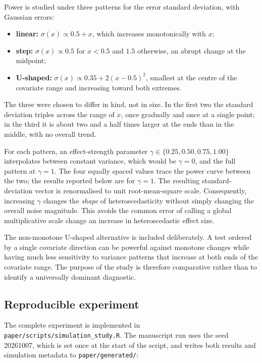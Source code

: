 Power is studied under three patterns for the error standard deviation, with
Gaussian errors:

\begin{itemize}
\tightlist
\item
  \textbf{linear:} \(\sigma(x)\propto 0.5+x\), which increases monotonically with
  \(x\);
\item
  \textbf{step:} \(\sigma(x)\propto 0.5\) for \(x<0.5\) and \(1.5\) otherwise, an
  abrupt change at the midpoint;
\item
  \textbf{U-shaped:} \(\sigma(x)\propto 0.35+2(x-0.5)^2\), smallest at the centre
  of the covariate range and increasing toward both extremes.
\end{itemize}

The three were chosen to differ in kind, not in size. In the first two the
standard deviation triples across the range of \(x\), once gradually and once
at a single point; in the third it is about two and a half times larger at the
ends than in the middle, with no overall trend.

For each pattern, an effect-strength parameter
\(\gamma\in\{0.25,0.50,0.75,1.00\}\) interpolates between constant
variance, which would be \(\gamma=0\), and the full pattern at
\(\gamma=1\). The four equally spaced values trace the power curve between
the two; the results reported below are for \(\gamma=1\). The resulting
standard-deviation vector is
renormalised to unit root-mean-square scale. Consequently, increasing
\(\gamma\) changes the \emph{shape} of heteroscedasticity without simply changing
the overall noise magnitude. This avoids the common error of calling a global
multiplicative scale change an increase in heteroscedastic effect size.

The non-monotone U-shaped alternative is included deliberately. A test ordered
by a single covariate direction can be powerful against monotone changes while
having much less sensitivity to variance patterns that increase at both ends of
the covariate range. The purpose of the study is therefore comparative rather
than to identify a universally dominant diagnostic.

\subsection{Reproducible experiment}\label{reproducible-experiment}

The complete experiment is implemented in
\texttt{paper/scripts/simulation\_study.R}. The manuscript run uses the seed 20261007,
which is set once at the start of the script, and writes both results and
simulation metadata to \texttt{paper/generated/}:

